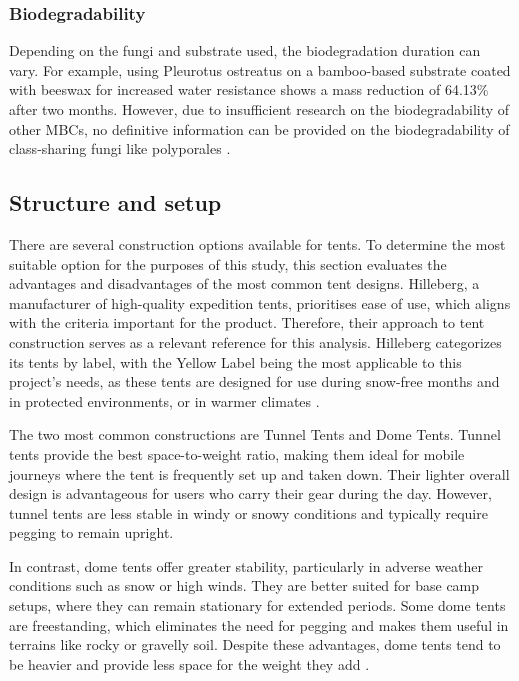 \documentclass{article}
\begin{document}
\subsubsection{Biodegradability}
Depending on the fungi and substrate used, the biodegradation duration can vary.
For example, using Pleurotus ostreatus on a bamboo-based substrate coated with beeswax
for increased water resistance shows a mass reduction of 64.13\% after two months. However,
due to insufficient research on the biodegradability of other MBCs, no definitive
information can be provided on the biodegradability of class-sharing fungi like
polyporales \parencite{gan}. 

\subsection{Structure and setup}
There are several construction options available for tents. To determine the most suitable
option for the purposes of this study, this section evaluates the advantages and
disadvantages of the most common tent designs. Hilleberg, a manufacturer of high-quality
expedition tents, prioritises ease of use, which aligns with the criteria important for
the product. Therefore, their approach to tent construction serves as a relevant reference
for this analysis. Hilleberg categorizes its tents by label, with the Yellow Label being
the most applicable to this project's needs, as these tents are designed for use during
snow-free months and in protected environments, or in warmer climates \parencite{hilleberg2024b}.

The two most common constructions are Tunnel Tents and Dome Tents. Tunnel tents
provide the best space-to-weight ratio, making them ideal for mobile journeys where the
tent is frequently set up and taken down. Their lighter overall design is advantageous for
users who carry their gear during the day. However, tunnel tents are less stable in windy
or snowy conditions and typically require pegging to remain upright.

In contrast, dome tents offer greater stability, particularly in adverse weather conditions
such as snow or high winds. They are better suited for base camp setups, where they can
remain stationary for extended periods. Some dome tents are freestanding, which
eliminates the need for pegging and makes them useful in terrains like rocky or gravelly
soil. Despite these advantages, dome tents tend to be heavier and provide less space for
the weight they add \parencite{hilleberg2024a}. 
\end{document}
